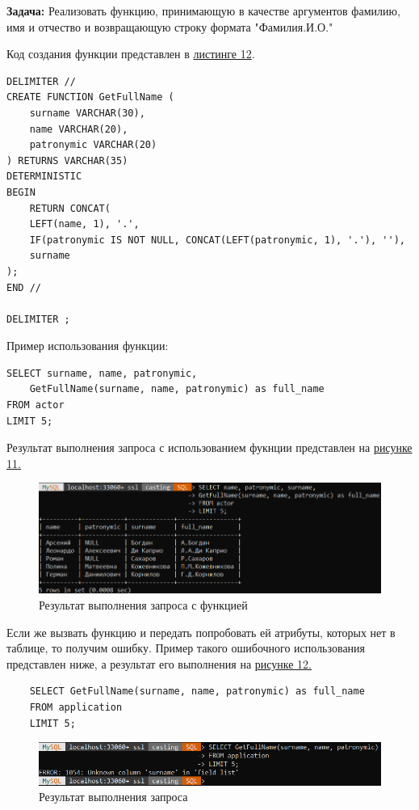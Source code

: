 \documentclass[11pt,a4paper,final]{article} %
\begin{document}
\textbf{Задача:} Реализовать функцию, принимающую в качестве аргументов фамилию, имя и отчество и возвращающую строку формата "Фамилия.И.О."

Код создания функции представлен в \hyperref[lst:l12]{листинге 12}.

\begin{lstlisting}[caption={Код создания функции GetFullName}, label=lst:l12]
DELIMITER //
CREATE FUNCTION GetFullName (
	surname VARCHAR(30), 
	name VARCHAR(20),
	patronymic VARCHAR(20)
) RETURNS VARCHAR(35)
DETERMINISTIC
BEGIN 
	RETURN CONCAT(
	LEFT(name, 1), '.', 
	IF(patronymic IS NOT NULL, CONCAT(LEFT(patronymic, 1), '.'), ''),
	surname
);
END //

DELIMITER ;

\end{lstlisting}

Пример использования функции: 

\begin{lstlisting}
SELECT surname, name, patronymic, 
	GetFullName(surname, name, patronymic) as full_name
FROM actor 
LIMIT 5;
\end{lstlisting}

Результат выполнения запроса с использованием фукнции представлен на \hyperref[fig:pic11]{рисунке 11.}

\begin{figure}[H]
	\centering
	\includegraphics[width=1.0\linewidth]{pic11.png}
	\caption{Результат выполнения запроса с функцией}
	\label{fig:pic11}
\end{figure}

Если же вызвать функцию и передать попробовать ей атрибуты, которых нет в таблице, то получим ошибку. Пример такого ошибочного использования представлен ниже, а результат его выполнения на \hyperref[fig:pic12]{рисунке 12.}
\begin{lstlisting}
	SELECT GetFullName(surname, name, patronymic) as full_name
	FROM application 
	LIMIT 5;
\end{lstlisting}

\begin{figure}[H]
	\centering
	\includegraphics[width=1.0\linewidth]{pic12.png}
	\caption{Результат выполнения запроса}
	\label{fig:pic12}
\end{figure}
\end{document}
